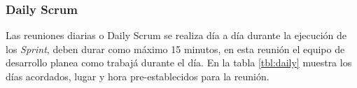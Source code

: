     
  
\subsubsection{Daily Scrum}

 Las reuniones diarias o Daily Scrum se realiza día a día durante la ejecución de los {\it Sprint}, deben
 durar como máximo 15 minutos, en esta reunión el equipo de desarrollo planea como trabajá durante el día.
 En la tabla \ref{tbl:daily} muestra los días acordados, lugar y hora pre-establecidos para la reunión.

     
   
    
